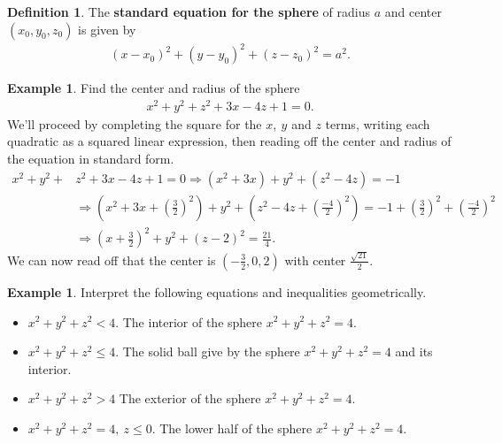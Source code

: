 \documentclass[12pt, letter]{article}
\theoremstyle{plain}
\numberwithin{theorem}{section}
\theoremstyle{definition}
\newtheorem{definition}[theorem]{Definition}
\newtheorem{example}[theorem]{Example}
\begin{document}
\begin{definition}
The \textbf{standard equation for the sphere} of radius $a$ and center $(x_0,y_0,z_0)$ is given by
\begin{align*}
(x-x_0)^2+(y-y_0)^2+(z-z_0)^2=a^2.
\end{align*}
\end{definition}

\bigskip

\hrulefill

\bigskip

\begin{example}
Find the center and radius of the sphere
\begin{align*}
x^2+y^2+z^2+3x-4z+1=0.
\end{align*}
We'll proceed by completing the square for the $x, \ y$ and $z$ terms, writing each quadratic as a squared linear expression, then reading off the center and radius of the equation in standard form.
\begin{align*}
x^2+y^2+&z^2+3x-4z+1=0 \Rightarrow (x^2+3x)+y^2+(z^2-4z) = -1\\
&\Rightarrow \left(x^2+3x+\left(\frac{3}{2}\right)^2\right) + y^2 + \left(z^2-4z+\left(\frac{-4}{2}\right)^2\right) = -1+\left(\frac{3}{2}\right)^2+\left(\frac{-4}{2}\right)^2\\
&\Rightarrow \left(x+\frac{3}{2}\right)^2+y^2+(z-2)^2 = \frac{21}{4}.
\end{align*}
We can now read off that the center is $\left(-\frac{3}{2},0,2\right)$ with center $\frac{\sqrt{21}}{2}$.
\end{example}

\bigskip

\hrulefill

\bigskip

\begin{example}
Interpret the following equations and inequalities geometrically.
\begin{itemize}
\item $x^2+y^2+z^2<4$. The interior of the sphere $x^2+y^2+z^2=4$.
\item $x^2+y^2+z^2\leq4$. The solid ball give by the sphere $x^2+y^2+z^2=4$ and its interior.
\item $x^2+y^2+z^2>4$ The exterior of the sphere $x^2+y^2+z^2=4$.
\item $x^2+y^2+z^2=4, \ z\leq 0$. The lower half of the sphere $x^2+y^2+z^2=4$.
\end{itemize}
\end{example}
\end{document}
